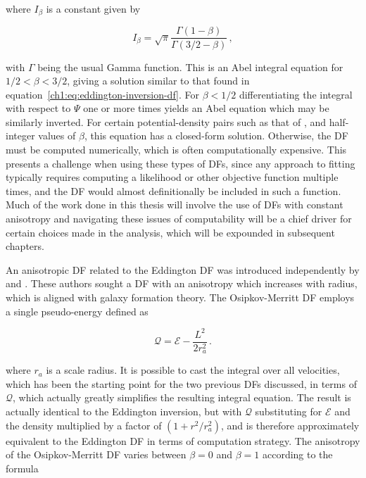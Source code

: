 \noindent where $I_{\beta}$ is a constant given by

\begin{equation}
    I_{\beta} = \sqrt{\pi}\frac{\Gamma(1-\beta)}{\Gamma(3/2-\beta)}\,,
\end{equation}

\noindent with $\Gamma$ being the usual Gamma function. This is an Abel integral equation for $1/2 < \beta < 3/2$, giving a solution similar to that found in equation~\eqref{ch1:eq:eddington-inversion-df}. For $\beta < 1/2$ differentiating the integral with respect to $\Psi$ one or more times yields an Abel equation which may be similarly inverted. For certain potential-density pairs such as that of \textcite{hernquist90}, and half-integer values of $\beta$, this equation has a closed-form solution. Otherwise, the DF must be computed numerically, which is often computationally expensive. This presents a challenge when using these types of DFs, since any approach to fitting typically requires computing a likelihood or other objective function multiple times, and the DF would almost definitionally be included in such a function. Much of the work done in this thesis will involve the use of DFs with constant anisotropy and navigating these issues of computability will be a chief driver for certain choices made in the analysis, which will be expounded in subsequent chapters.

An anisotropic DF related to the Eddington DF was introduced independently by \textcite{osipkov79} and \textcite{merritt85}. These authors sought a DF with an anisotropy which increases with radius, which is aligned with galaxy formation theory. The Osipkov-Merritt DF employs a single pseudo-energy defined as 

\begin{equation}
    \label{ch1:eq:osipkov-merritt-pseudo-energy}
    \mathcal{Q} = \mathcal{E} - \frac{L^{2}}{2r_{a}^{2}}\,.
\end{equation}

\noindent where $r_{a}$ is a scale radius. It is possible to cast the integral over all velocities, which has been the starting point for the two previous DFs discussed, in terms of $\mathcal{Q}$, which actually greatly simplifies the resulting integral equation. The result is actually identical to the Eddington inversion, but with $\mathcal{Q}$ substituting for $\mathcal{E}$ and the density multiplied by a factor of $(1 + r^{2}/r_{a}^{2})$, and is therefore approximately equivalent to the Eddington DF in terms of computation strategy. The anisotropy of the Osipkov-Merritt DF varies between $\beta=0$ and $\beta=1$ according to the formula

